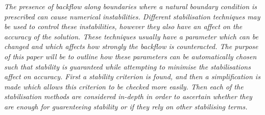 \textit{
The presence of backflow along boundaries where a natural boundary condition is prescribed can cause numerical instabilities. Different stabilisation techniques may be used to control these instabilities, however they also have an affect on the accuracy of the solution. These techniques usually have a parameter which can be changed and which affects how strongly the backflow is counteracted. The purpose of this paper will be to outline how these parameters can be automatically chosen such that stability is guaranteed while attempting to minimise the stabilisations affect on accuracy. First a stability criterion is found, and then a simplification is made which allows this criterion to be checked more easily. Then each of the stabilisation methods are considered in-depth in order to ascertain whether they are enough for guarenteeing stability or if they rely on other stabilising terms.
}